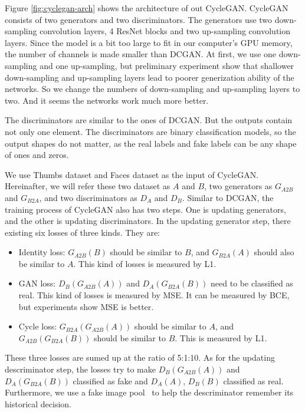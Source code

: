 \documentclass[10pt,twocolumn,letterpaper]{article}
\begin{document}
Figure \ref{fig:cyclegan-arch} shows the architecture of out CycleGAN. CycleGAN
consists of two generators and two discriminators. The generators use two
down-sampling convolution layers, 4 ResNet blocks and two up-sampling
convolution layers. Since the model is a bit too large to fit in our computer's
GPU memory, the number of channels is made smaller than DCGAN. At first, we use
one down-sampling and one up-sampling, but preliminary experiment show that
shallower down-sampling and up-sampling layers lead to poorer generization
ability of the networks. So we change the numbers of down-sampling and
up-sampling layers to two. And it seems the networks work much more better.

The discriminators are similar to the ones of DCGAN. But the outputs contain
not only one element. The discriminators are binary classification models, so
the output shapes do not matter, as the real labels and fake labels can be any
shape of ones and zeros.

We use Thumbs dataset and Faces dataset as the input of CycleGAN. Hereinafter,
we will refer these two dataset as $A$ and $B$, two generators as $G_{A2B}$ and
$G_{B2A}$, and two discriminators as $D_A$ and $D_B$. Similar to DCGAN, the
training process of CycleGAN also has two steps. One is updating generators, and
the other is updating discriminators. In the updating generator step, there
existing six losses of three kinds. They are:
\begin{itemize}[noitemsep, topsep=0pt]
   \item Identity loss: $G_{A2B}(B)$ should be similar to $B$, and $G_{B2A}(A)$
   should also be similar to $A$. This kind of losses is measured by L1.
   \item GAN loss: $D_B(G_{A2B}(A))$ and $D_A(G_{B2A}(B))$ need to be classified
   as real. This kind of losses is measured by MSE. It can be measured by BCE,
   but experiments show MSE is better.
   \item Cycle loss: $G_{B2A}(G_{A2B}(A))$ should be similar to $A$, and
   $G_{A2B}(G_{B2A}(B))$ should be similar to $B$. This is measured by L1.
\end{itemize}
These three losses are sumed up at the ratio of 5:1:10. As for the updating
descriminator step, the losses try to make $D_B(G_{A2B}(A))$ and
$D_A(G_{B2A}(B))$ classified as fake and $D_A(A)$, $D_B(B)$ classified as real.
Furthermore, we use a fake image pool~\cite{shrivastava2017learning} to help the
descriminator remember its historical decision.
\end{document}
